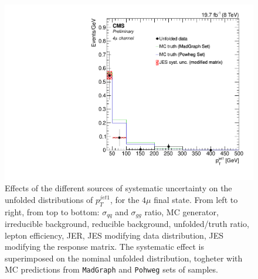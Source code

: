 \begin{figure}[hbtp]
\begin{center}
   \includegraphics[width=0.8\cmsFigWidth]{Figures/Unfolding/Systematics/ZZTo4m_PtJet1_JES_ModMat_Mad_fr}
   \caption{Effects of the different sources of systematic uncertainty on the unfolded distributions of  $p_{T}^{jet1}$, for the     
   $4\mu$ final state. From left to right, from top to bottom: $\sigma_{qq}$ and $\sigma_{gg}$ ratio, MC generator, irreducible background, reducible background, unfolded/truth ratio, lepton efficiency, JER, JES modifying data distribution, JES modifying the response matrix. The systematic effect is superimposed on the nominal unfolded distribution, togheter with MC predictions from \texttt{MadGraph} and \texttt{Pohweg} sets of samples.}
   \label{fig:PtJet1_syst_4m}
 \end{center}
\end{figure}

